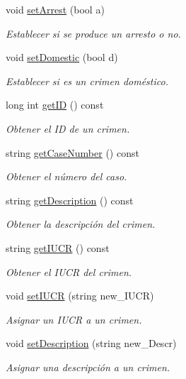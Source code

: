 \begin{DoxyCompactItemize}
void \hyperlink{classcrimen_ae08b85470038469179a01ba753b7641a}{set\+Arrest} (bool a)
\begin{DoxyCompactList}\small\item\em Establecer si se produce un arresto o no. \end{DoxyCompactList}\item 
void \hyperlink{classcrimen_a3ec14cf4bb0464350d8efd98d2679d41}{set\+Domestic} (bool d)
\begin{DoxyCompactList}\small\item\em Establecer si es un crimen doméstico. \end{DoxyCompactList}\item 
long int \hyperlink{classcrimen_aa33f92f889c7f1815ed4bfd56c578bce}{get\+I\+D} () const 
\begin{DoxyCompactList}\small\item\em Obtener el I\+D de un crimen. \end{DoxyCompactList}\item 
string \hyperlink{classcrimen_ab3c025eb20cdcea9192ee190fa2af015}{get\+Case\+Number} () const 
\begin{DoxyCompactList}\small\item\em Obtener el número del caso. \end{DoxyCompactList}\item 
string \hyperlink{classcrimen_a61789d65209d167149df197272d8feba}{get\+Description} () const 
\begin{DoxyCompactList}\small\item\em Obtener la descripción del crimen. \end{DoxyCompactList}\item 
string \hyperlink{classcrimen_a8738020069c3a3b3500d044f9580f93a}{get\+I\+U\+C\+R} () const 
\begin{DoxyCompactList}\small\item\em Obtener el I\+U\+C\+R del crimen. \end{DoxyCompactList}\item 
void \hyperlink{classcrimen_a1f64e937436244d47af1f92cb63c7254}{set\+I\+U\+C\+R} (string new\+\_\+\+I\+U\+C\+R)
\begin{DoxyCompactList}\small\item\em Asignar un I\+U\+C\+R a un crimen. \end{DoxyCompactList}\item 
void \hyperlink{classcrimen_aa2f141046bf44d87e5bc25ae197dcbd0}{set\+Description} (string new\+\_\+\+Descr)
\begin{DoxyCompactList}\small\item\em Asignar una descripción a un crimen. \end{DoxyCompactList}\item 

\end{DoxyCompactItemize}

